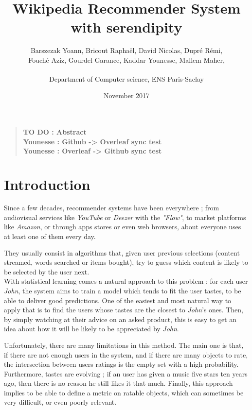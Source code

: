 \documentclass[11pt]{article}
\title{Wikipedia Recommender System with serendipity}
\author
    {
      Barszezak Yoann, Bricout Rapha\"el, David Nicolas, Dupr\'e R\'emi,\\
      Fouch\'e Aziz, Gourdel Garance, Kaddar Younesse, Mallem Maher,\\
      \\
      \normalsize{Department of Computer science, ENS Paris-Saclay}\\
    }
\date{November 2017}
\theoremstyle{plain}
\theoremstyle{definition}
\theoremstyle{remark}
\newenvironment{sciabstract}{
\begin{quote} \bf}
{\end{quote}}
\begin{document}
 


\baselineskip10pt


\maketitle 




\begin{sciabstract}
  TO DO : Abstract\\
  Younesse : Github -> Overleaf sync test\\
  Younesse : Overleaf -> Github sync test
\end{sciabstract}


\tableofcontents


\section*{Introduction}

Since a few decades, recommender systems have been everywhere ; from audiovisual services like \textit{YouTube} or \textit{Deezer} with the \textit{"Flow"}, to market platforms like \textit{Amazon}, or through apps stores or even web browsers, about everyone uses at least one of them every day. 

They usually consist in algorithms that, given user previous selections (content streamed, words searched or items bought), try to guess which content is likely to be selected by the user next. \\

With statistical learning comes a natural approach to this problem : for each user \textit{John}, the system aims to train a model which tends to fit the user tastes, to be able to deliver good predictions. One of the easiest and most natural way to apply that is to find the users whose tastes are the closest to \textit{John}'s ones. Then, by simply watching at their advice on an asked product, this is easy to get an idea about how it will be likely to be appreciated by \textit{John}.

Unfortunately, there are many limitations in this method. The main one is that, if there are not enough users in the system, and if there are many objects to rate, the intersection between users ratings is the empty set with a high probability. Furthermore, tastes are evolving ; if an user has given a music five stars ten years ago, then there is no reason he still likes it that much. Finally, this approach implies to be able to define a metric on ratable objects, which can sometimes be very difficult, or even poorly relevant. \\
\end{document}

